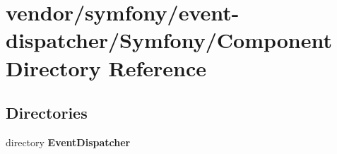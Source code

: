 \section{vendor/symfony/event-\/dispatcher/\+Symfony/\+Component Directory Reference}
\label{dir_d23a37e19047470ac725cf2f9abd67c7}
\subsection*{Directories}
\begin{DoxyCompactItemize}
\item 
directory {\bf Event\+Dispatcher}
\end{DoxyCompactItemize}
